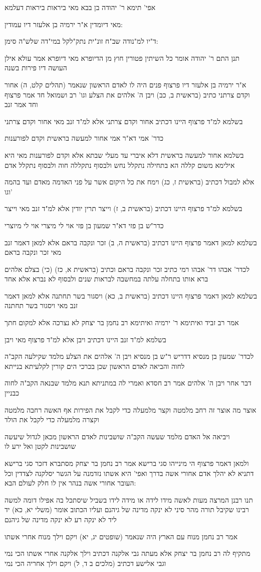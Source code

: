 \documentclass[12pt, openany]{book}
\newcommand{\sethebfont}{
\fontsize{10.5pt}{21.0pt} \selectfont
}
\newcommand{\textblock}[1]{
{\sethebfont #1\\}	
}
\begin{document}
\textblock{אפי' תימא ר' יהודה בן בבא מאי ביראות ביראות דעלמא}
\textblock{מאי דיומדין א"ר ירמיה בן אלעזר דיו עמודין:}
\textblock{ד"יו למ"נודה שב"ח זונ"ית נתק"לקל במי"דה שלש"ה סימן:}
\textblock{תנן התם ר' יהודה אומר כל השיתין פטורין חוץ מן הדיופרא מאי דיופרא אמר עולא אילן העושה דיו פירות בשנה}
\textblock{א"ר ירמיה בן אלעזר דיו פרצוף פנים היה לו לאדם הראשון שנאמר (תהלים קלט, ה) אחור וקדם צרתני כתיב (בראשית ב, כב) ויבן ה' אלהים את הצלע וגו' רב ושמואל חד אמר פרצוף וחד אמר זנב}
\textblock{בשלמא למ"ד פרצוף היינו דכתיב אחור וקדם צרתני אלא למ"ד זנב מאי אחור וקדם צרתני}
\textblock{כדר' אמי דא"ר אמי אחור למעשה בראשית וקדם לפורענות}
\textblock{בשלמא אחור למעשה בראשית דלא איברי עד מעלי שבתא אלא וקדם לפורענות מאי היא אילימא משום קללה הא בתחילה נתקלל נחש ולבסוף נתקללה חוה ולבסוף נתקלל אדם}
\textblock{אלא למבול דכתיב (בראשית ז, כג) וימח את כל היקום אשר על פני האדמה מאדם ועד בהמה וגו'}
\textblock{בשלמא למ"ד פרצוף היינו דכתיב (בראשית ב, ז) וייצר תרין יודין אלא למ"ד זנב מאי וייצר}
\textblock{כדר"ש בן פזי דא"ר שמעון בן פזי אוי לי מיצרי אוי לי מיוצרי}
\textblock{בשלמא למאן דאמר פרצוף היינו דכתיב (בראשית ה, ב) זכר ונקבה בראם אלא למאן דאמר זנב מאי זכר ונקבה בראם}
\textblock{לכדר' אבהו דר' אבהו רמי כתיב זכר ונקבה בראם וכתיב (בראשית א, כז) (כי) בצלם אלהים ברא אותו בתחלה עלתה במחשבה לבראות שנים ולבסוף לא נברא אלא אחד}
\textblock{בשלמא למאן דאמר פרצוף היינו דכתיב (בראשית ב, כא) ויסגור בשר תחתנה אלא למאן דאמר זנב מאי ויסגור בשר תחתנה}
\textblock{אמר רב זביד ואיתימא ר' ירמיה ואיתימא רב נחמן בר יצחק לא נצרכה אלא למקום חתך}
\textblock{בשלמא למ"ד זנב היינו דכתיב ויבן אלא למ"ד פרצוף מאי ויבן}
\textblock{לכדר' שמעון בן מנסיא דדריש ר"ש בן מנסיא ויבן ה' אלהים את הצלע מלמד שקילעה הקב"ה לחוה והביאה לאדם הראשון שכן בכרכי הים קורין לקלעיתא בנייתא}
\textblock{דבר אחר ויבן ה' אלהים אמר רב חסדא ואמרי לה במתניתא תנא מלמד שבנאה הקב"ה לחוה כבניין}
\textblock{אוצר מה אוצר זה רחב מלמטה וקצר מלמעלה כדי לקבל את הפירות אף האשה רחבה מלמטה וקצרה מלמעלה כדי לקבל את הולד}
\textblock{ויביאה אל האדם מלמד שעשה הקב"ה שושבינות לאדם הראשון מכאן לגדול שיעשה שושבינות לקטן ואל ירע לו}
\textblock{ולמאן דאמר פרצוף הי מינייהו סגי ברישא אמר רב נחמן בר יצחק מסתברא דזכר סגי ברישא דתניא לא יהלך אדם אחורי אשה בדרך ואפי' היא אשתו נזדמנה על הגשר יסלקנה לצדדין וכל העובר אחורי אשה בנהר אין לו חלק לעולם הבא:}
\textblock{תנו רבנן המרצה מעות לאשה מידו לידה או מידה לידו בשביל שיסתכל בה אפילו דומה למשה רבינו שקיבל תורה מהר סיני לא ינקה מדינה של גיהנם ועליו הכתוב אומר (משלי יא, כא) יד ליד לא ינקה רע לא ינקה מדינה של גיהנם}
\textblock{אמר רב נחמן מנוח עם הארץ היה שנאמר (שופטים יג, יא) ויקם וילך מנוח אחרי אשתו}
\textblock{מתקיף לה רב נחמן בר יצחק אלא מעתה גבי אלקנה דכתיב וילך אלקנה אחרי אשתו הכי נמי וגבי אלישע דכתיב (מלכים ב ד, ל) ויקם וילך אחריה הכי נמי}
\end{document}
